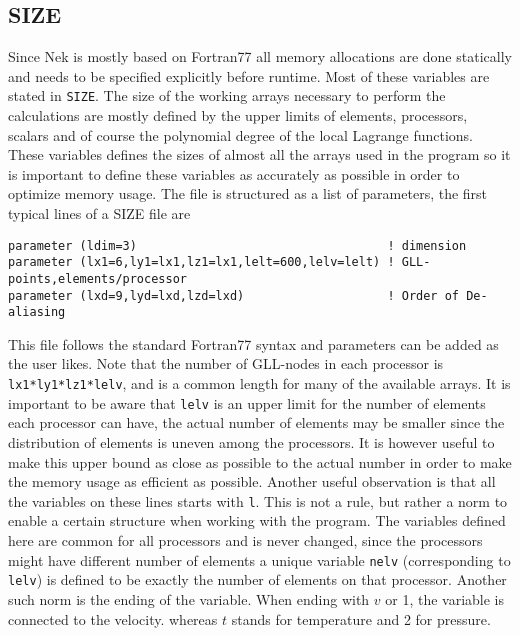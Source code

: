 \subsection{SIZE}
Since Nek is mostly based on Fortran77 all memory allocations are done statically and needs to be specified explicitly 
before runtime. Most of these variables are stated in \verb|SIZE|. The size of the working arrays 
necessary to perform the calculations are mostly defined by the upper limits of elements, 
processors, scalars and of course the polynomial degree
of the local Lagrange functions. These variables defines the sizes of almost all 
the arrays used in the program so it is important to define these variables as accurately 
as possible in order to optimize memory usage. The file is structured as a list of parameters, the 
first typical lines of a SIZE file are
\begingroup
\fontsize{12pt}{14pt}
\begin{lstlisting}[escapechar=|,frame=none]
parameter (ldim=3)                                   ! dimension
parameter (lx1=6,ly1=lx1,lz1=lx1,lelt=600,lelv=lelt) ! GLL-points,elements/processor
parameter (lxd=9,lyd=lxd,lzd=lxd)                    ! Order of De-aliasing
\end{lstlisting}
\endgroup
This file follows the standard Fortran77 syntax and parameters can be added as the user likes. 
Note that the number of GLL-nodes in each processor is \verb|lx1*ly1*lz1*lelv|, and
is a common length for many of the available arrays. It is important to be aware that \verb|lelv|
is an upper limit for the number of elements each processor can have, the actual number of elements
may be smaller since the distribution of elements is uneven among the processors. It is however 
useful to make this upper bound as close as possible to the actual number in order to make the 
memory usage as efficient as possible. Another useful observation is that all the variables on 
these lines starts with \verb|l|. This is not a rule, but rather a norm to enable a certain 
structure when working with the program. The variables defined here are common for all processors
and is never changed, since the processors might have different number of elements a unique 
variable \verb|nelv| (corresponding to \verb|lelv|) is defined to be 
exactly the number of elements on that processor. Another such norm is the ending of 
the variable. When ending with $v$ or 1, the variable is connected to the velocity. 
whereas $t$ stands for temperature and 2 for pressure. 



%
